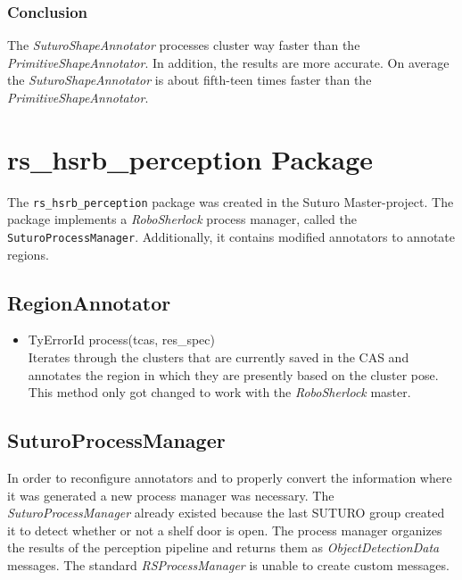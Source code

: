 \documentclass[main.tex]{subfiles}
\begin{document}
\subsubsection{Conclusion}
The \textit{SuturoShapeAnnotator} processes cluster way faster than the \textit{PrimitiveShapeAnnotator}. In addition, the results are more accurate.
On average the \textit{SuturoShapeAnnotator} is about fifth-teen times faster than the \textit{PrimitiveShapeAnnotator}.

\section{rs\_hsrb\_perception Package}

The \texttt{rs\_hsrb\_perception} package was created in the Suturo Master-project. The package implements a \textit{RoboSherlock} process manager, called the\\ \texttt{SuturoProcessManager}. Additionally, it contains modified annotators to annotate regions.

\subsection{RegionAnnotator}
\begin{itemize}
\item TyErrorId process(tcas, res\_spec)\\
Iterates through the clusters that are currently saved in the CAS and annotates the region in which they are presently based on the cluster pose.
This method only got changed to work with the \textit{RoboSherlock} master.
\end{itemize}

\subsection{SuturoProcessManager}
In order to reconfigure annotators and to properly convert the information where it was generated a new process manager was necessary.
The \textit{SuturoProcessManager} already existed because the last SUTURO group created it to detect whether or not a shelf door is open.
The process manager organizes the results of the perception pipeline and returns them as \textit{ObjectDetectionData} messages.
The standard \textit{RSProcessManager} is unable to create custom messages.
\end{document}
